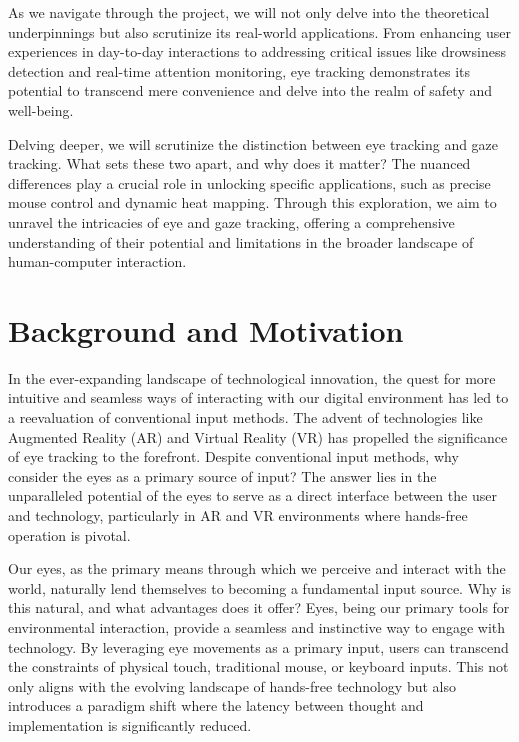 \documentclass[letterpaper, 10 pt, conference]{ieeeconf}  %
\begin{document}
As we navigate through the project, we will not only delve into the theoretical underpinnings but also scrutinize its real-world applications. From enhancing user experiences in day-to-day interactions to addressing critical issues like drowsiness detection and real-time attention monitoring, eye tracking demonstrates its potential to transcend mere convenience and delve into the realm of safety and well-being.

Delving deeper, we will scrutinize the distinction between eye tracking and gaze tracking. What sets these two apart, and why does it matter? The nuanced differences play a crucial role in unlocking specific applications, such as precise mouse control and dynamic heat mapping. Through this exploration, we aim to unravel the intricacies of eye and gaze tracking, offering a comprehensive understanding of their potential and limitations in the broader landscape of human-computer interaction.


\section{Background and Motivation}

In the ever-expanding landscape of technological innovation, the quest for more intuitive and seamless ways of interacting with our digital environment has led to a reevaluation of conventional input methods. The advent of technologies like Augmented Reality (AR) and Virtual Reality (VR) has propelled the significance of eye tracking to the forefront. Despite conventional input methods, why consider the eyes as a primary source of input? The answer lies in the unparalleled potential of the eyes to serve as a direct interface between the user and technology, particularly in AR and VR environments where hands-free operation is pivotal.

Our eyes, as the primary means through which we perceive and interact with the world, naturally lend themselves to becoming a fundamental input source. Why is this natural, and what advantages does it offer? Eyes, being our primary tools for environmental interaction, provide a seamless and instinctive way to engage with technology. By leveraging eye movements as a primary input, users can transcend the constraints of physical touch, traditional mouse, or keyboard inputs. This not only aligns with the evolving landscape of hands-free technology but also introduces a paradigm shift where the latency between thought and implementation is significantly reduced.
\end{document}
